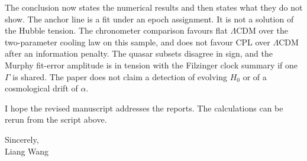 \documentclass[11pt]{article}
\begin{document}
The conclusion now states the numerical results and then states what they do not show.
The anchor line is a fit under an epoch assignment.
It is not a solution of the Hubble tension.
The chronometer comparison favours flat $\Lambda$CDM over the two-parameter cooling law on this sample, and does not favour CPL over $\Lambda$CDM after an information penalty.
The quasar subsets disagree in sign, and the Murphy fit-error amplitude is in tension with the Filzinger clock summary if one $\Gamma$ is shared.
The paper does not claim a detection of evolving $H_{0}$ or of a cosmological drift of $\alpha$.

\vspace{1.2em}
\noindent
I hope the revised manuscript addresses the reports.
The calculations can be rerun from the script above.

\vspace{1em}
\noindent
Sincerely,\\
Liang Wang
\end{document}
